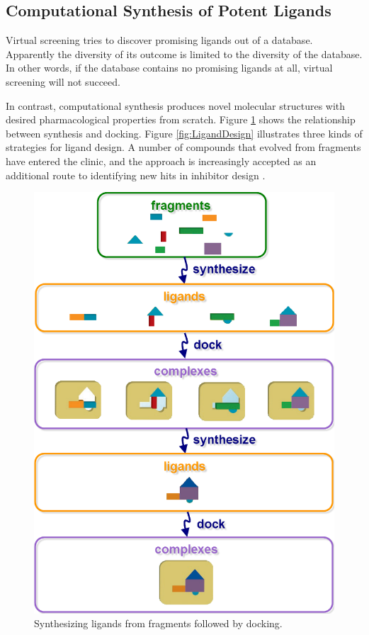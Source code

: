 \subsection{Computational Synthesis of Potent Ligands}

Virtual screening tries to discover promising ligands out of a database. Apparently the diversity of its outcome is limited to the diversity of the database. In other words, if the database contains no promising ligands at all, virtual screening will not succeed.

In contrast, computational synthesis produces novel molecular structures with desired pharmacological properties from scratch. Figure \ref{fig:ComputationalSynthesis} shows the relationship between synthesis and docking. Figure \ref{fig:LigandDesign} \citep{363} illustrates three kinds of strategies for ligand design. A number of compounds that evolved from fragments have entered the clinic, and the approach is increasingly accepted as an additional route to identifying new hits in inhibitor design \citep{363,470}.

\begin{figure}
\centering
\includegraphics[width=\textwidth]{Figures/ComputationalSynthesis.png}
\caption{Synthesizing ligands from fragments followed by docking.}
\label{fig:ComputationalSynthesis}
\end{figure}

